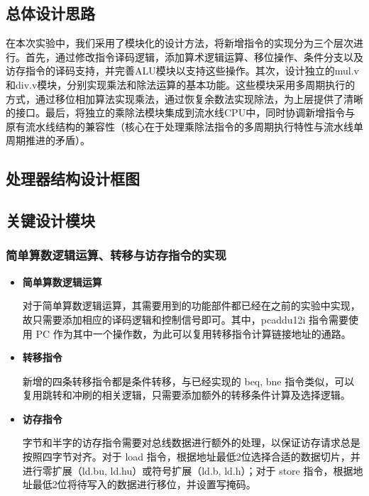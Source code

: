 \documentclass[11pt]{article}
\begin{document}
\subsection{总体设计思路}

在本次实验中，我们采用了模块化的设计方法，将新增指令的实现分为三个层次进行。首先，通过修改指令译码逻辑，添加算术逻辑运算、移位操作、条件分支以及访存指令的译码支持，并完善ALU模块以支持这些操作。其次，设计独立的mul.v和div.v模块，分别实现乘法和除法运算的基本功能。这些模块采用多周期执行的方式，通过移位相加算法实现乘法，通过恢复余数法实现除法，为上层提供了清晰的接口。最后，将独立的乘除法模块集成到流水线CPU中，同时协调新增指令与原有流水线结构的兼容性（核心在于处理乘除法指令的多周期执行特性与流水线单周期推进的矛盾）。

\subsection{处理器结构设计框图}


\subsection{关键设计模块}

\subsubsection{简单算数逻辑运算、转移与访存指令的实现}

\begin{itemize}

\item \textbf{简单算数逻辑运算}

  对于简单算数逻辑运算，其需要用到的功能部件都已经在之前的实验中实现，故只需要添加相应的译码逻辑和控制信号即可。其中，pcaddu12i 指令需要使用 PC 作为其中一个操作数，为此可以复用转移指令计算链接地址的通路。

\item \textbf{转移指令}

  新增的四条转移指令都是条件转移，与已经实现的 beq, bne 指令类似，可以复用跳转和冲刷的相关逻辑，只需要添加额外的转移条件计算及选择逻辑。

\item \textbf{访存指令}

  字节和半字的访存指令需要对总线数据进行额外的处理，以保证访存请求总是按照四字节对齐。对于 load 指令，根据地址最低2位选择合适的数据切片，并进行零扩展（ld.bu, ld.hu）或符号扩展（ld.b, ld.h）；对于 store 指令，根据地址最低2位将待写入的数据进行移位，并设置写掩码。

\end{itemize}
\end{document}
